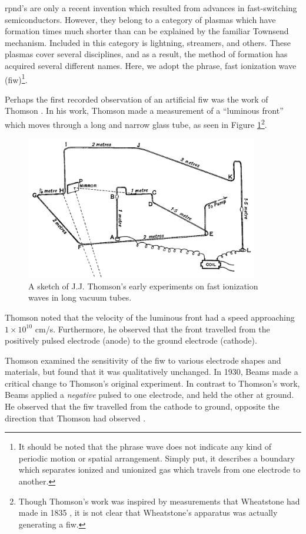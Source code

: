 \acs{rpnd}'s are only a recent invention which resulted from advances in
fast-switching semiconductors. However, they belong to a category of plasmas
which have formation times much shorter than can be explained by the familiar
Townsend mechanism. Included in this category is lightning, streamers, and
others. These plasmas cover several disciplines, and as a result, the method of
formation has acquired several different names. Here, we adopt the phrase, fast
ionization wave (\acs{fiw})\footnote{It should be noted that the phrase wave
does not indicate any kind of periodic motion or spatial arrangement. Simply
put, it describes a boundary which separates ionized and unionized gas which
travels from one electrode to another.}.

Perhaps the first recorded observation of an artificial \acs{fiw} was the work
of Thomson \cite{Thomson1893}. In his work, Thomson made a measurement of a
``luminous front'' which moves through a long and narrow glass tube, as seen in
Figure \ref{fig:thomson}\footnote{Though Thomson's work was inspired by
measurements that Wheatstone had made in 1835 \cite{Wheatstone1835}, it is not
clear that Wheatstone's apparatus was actually generating a \acs{fiw}.}.
\begin{figure}
  \centering
  \includegraphics[width=4in]{chapters/introduction/figures/thomson.png}
  \caption{A sketch of J.J. Thomson's early experiments on fast ionization
  waves in long vacuum tubes.}\label{fig:thomson}
\end{figure}
Thomson noted that the velocity of the luminous front had a speed approaching
$1\times10^{10}$ cm/s. Furthermore, he observed that the front travelled from
the positively pulsed electrode (anode) to the ground electrode (cathode).

Thomson examined the sensitivity of the \acs{fiw} to various electrode shapes
and materials, but found that it was qualitatively unchanged. In 1930, Beams
made a critical change to Thomson's original experiment. In contrast to
Thomson's work, Beams applied a \emph{negative} pulsed to one electrode, and
held the other at ground. He observed that the \acs{fiw} travelled from the
cathode to ground, opposite the direction that Thomson had observed
\cite{Beams1930}.

